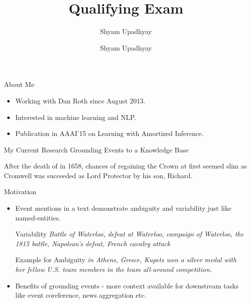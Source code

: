

\author{Shyam Upadhyay}
\title{Qualifying Exam}

\date{Shyam Upadhyay} 



\begin{frame}
\titlepage
\end{frame}

\begin{frame}{About Me}
\begin{itemize}
\item Working with Dan Roth since August 2013.
\item Interested in machine learning and NLP.
\item Publication in AAAI'15 on Learning with Amortized Inference.
\end{itemize}
\end{frame}

\begin{frame}{My Current Research}
Grounding Events to a Knowledge Base
\begin{block}{}
After the {\color{blue} death of } in 1658,  chances of regaining the Crown at first seemed slim as Cromwell was succeeded as Lord Protector by his son, Richard.
\end{block}
\end{frame}

\begin{frame}{Motivation}
\begin{itemize}
\item Event mentions in a text demonstrate ambiguity and variability just like named-entities.
\begin{exampleblock}{Variability}
\emph{Battle of Waterloo, defeat at Waterloo, campaign of Waterloo, the 1815 battle, Napolean's defeat, French cavalry attack}
\end{exampleblock}
\begin{exampleblock}{Example for Ambiguity}
\emph{ in Athens, Greece, Kupets won a silver medal with her fellow U.S. team members in the team all-around competition.}
\end{exampleblock}
\item Benefits of grounding events - more context available for downstream tasks like event coreference, news aggregation etc.
\end{itemize}
\end{frame}

